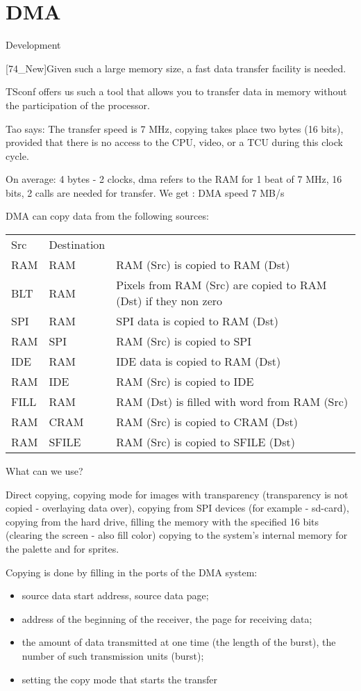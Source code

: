\chapter{DMA} 
Development

[74\_New]Given such a large memory size, a fast data transfer facility
is needed.

TSconf offers us such a tool that allows you to transfer data in
memory without the participation of the processor.


Tao says: The transfer speed is 7 MHz, copying takes place two bytes
(16 bits), provided that there is no access to the CPU, video, or a
TCU during this clock cycle.

On average: 4 bytes - 2 clocks, dma refers to the RAM for 1 beat of 7
MHz, 16 bits, 2 calls are needed for transfer. We get : DMA speed 7
MB/s

DMA can copy data from the following sources:
\begin{table}
\begin{tabular}{lll}
Src & Destination & \\
RAM & RAM & RAM (Src) is copied to RAM (Dst)\\
BLT & RAM & Pixels from RAM (Src) are copied to RAM (Dst) if they non zero\\
SPI & RAM & SPI data is copied to RAM (Dst)\\
RAM & SPI & RAM (Src) is copied to SPI\\
IDE & RAM & IDE data is copied to RAM (Dst)\\
RAM & IDE & RAM (Src) is copied to IDE\\
FILL & RAM & RAM (Dst) is filled with word from RAM (Src)\\
RAM & CRAM & RAM (Src) is copied to CRAM (Dst)\\
RAM & SFILE & RAM (Src) is copied to SFILE (Dst)\\
\end{tabular}
\end{table}
What can we use?

Direct copying, copying mode for images with transparency
(transparency is not copied - overlaying data over), copying from SPI
devices (for example - sd-card), copying from the hard drive, filling
the memory with the specified 16 bits (clearing the screen - also fill
color) copying to the system’s internal memory for the palette and for
sprites.

Copying is done by filling in the ports of the DMA system:
\begin{itemize}
\item source data start address, source data page;
\item address of the beginning of the receiver, the page for receiving
  data;
\item the amount of data transmitted at one time (the length of the
  burst), the number of such transmission units (burst);
\item setting the copy mode that starts the transfer
\end{itemize}

